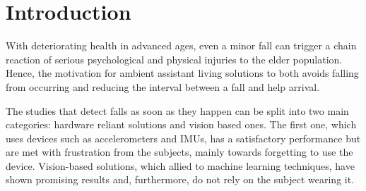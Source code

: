 \documentclass[conference]{IEEEtran}
\begin{document}
\section{Introduction}
With deteriorating health in advanced ages, even a minor fall can trigger a chain reaction of serious psychological and physical injuries to the elder population. Hence, the motivation for ambient assistant living solutions to both avoids falling from occurring and reducing the interval between a fall and help arrival.\par
The studies that detect falls as soon as they happen can be split into two main categories: hardware reliant solutions and vision based ones. The first one, which uses devices such as accelerometers and IMUs, has a satisfactory performance but are met with frustration from the subjects, mainly towards forgetting to use the device. Vision-based solutions, which allied to machine learning techniques, have shown promising results and, furthermore, do not rely on the subject wearing it.\par
\end{document}
